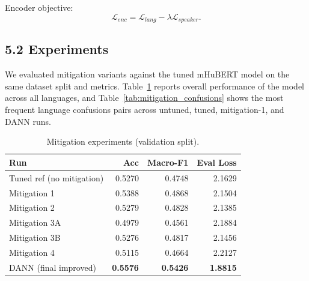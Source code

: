 \documentclass[11pt]{article}
\begin{document}
Encoder objective:
\[
\mathcal{L}_{enc} = \mathcal{L}_{lang} - \lambda \mathcal{L}_{speaker}.
\]

\subsection*{5.2 Experiments}
We evaluated mitigation variants against the tuned mHuBERT model on the same dataset split and metrics. Table~\ref{tab:task2_summary} reports overall performance of the model across all languages, and Table~\ref{tab:mitigation_confusions} shows the most frequent language confusions pairs across untuned, tuned, mitigation-1, and DANN runs.

\begin{table}[h]
\centering
\small
\setlength{\tabcolsep}{3pt}
\begin{tabular}{@{}p{}rrr@{}}
\toprule
Run & Acc & Macro-F1 & Eval Loss \\
\midrule
Tuned ref (no mitigation) & 0.5270 & 0.4748 & 2.1629 \\
Mitigation 1 & 0.5388 & 0.4868 & 2.1504 \\
Mitigation 2 & 0.5279 & 0.4828 & 2.1385 \\
Mitigation 3A & 0.4979 & 0.4561 & 2.1884 \\
Mitigation 3B & 0.5276 & 0.4817 & 2.1456 \\
Mitigation 4 & 0.5115 & 0.4664 & 2.2127 \\
DANN (final improved) & \textbf{0.5576} & \textbf{0.5426} & \textbf{1.8815} \\
\bottomrule
\end{tabular}
\caption{Mitigation experiments (validation split).}
\label{tab:task2_summary}
\end{table}

\begin{table}[h]
\centering
\small
\setlength{\tabcolsep}{2.5pt}
\caption{Confusion-pair counts across key runs.}
\label{tab:mitigation_confusions}
\end{table}
\end{document}
